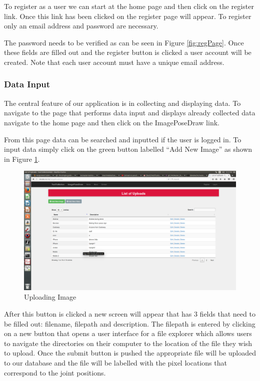 \documentclass{scrreprt}
\begin{document}
\FloatBarrier

To register as a user we can start at the home page and then click on the
register link.  Once this link has been clicked on the register page will
appear.  To register only an email address and password are necessary.

The password needs to be verified as can be seen in Figure \ref{fig:regPage}.
Once these fields are filled out and the register button is clicked a user
account will be created.  Note that each user account must have a unique email
address.

\subsubsection{Data Input}

The central feature of our application is in collecting and displaying data.
To navigate to the page that performs data input and displays already collected
data navigate to the home page and then click on the ImagePoseDraw link.

From this page data can be searched and inputted if the user is logged in.  To
input data simply click on the green button labelled ``Add New Image'' as shown
in Figure \ref{fig:uploadImage}.

\begin{figure}
  \includegraphics[width=\linewidth]{uploadPage.png}
  \caption{Uploading Image}
  \label{fig:uploadImage}
\end{figure}

\FloatBarrier

After this button is clicked a new screen will appear that has 3 fields that
need to be filled out: filename, filepath and description.  The filepath is
entered by clicking on a new button that opens a user interface for a file
explorer which allows users to navigate the directories on their computer to
the location of the file they wish to upload.  Once the submit button is pushed
the appropriate file will be uploaded to our database and the file will be
labelled with the pixel locations that correspond to the joint positions.
\end{document}
